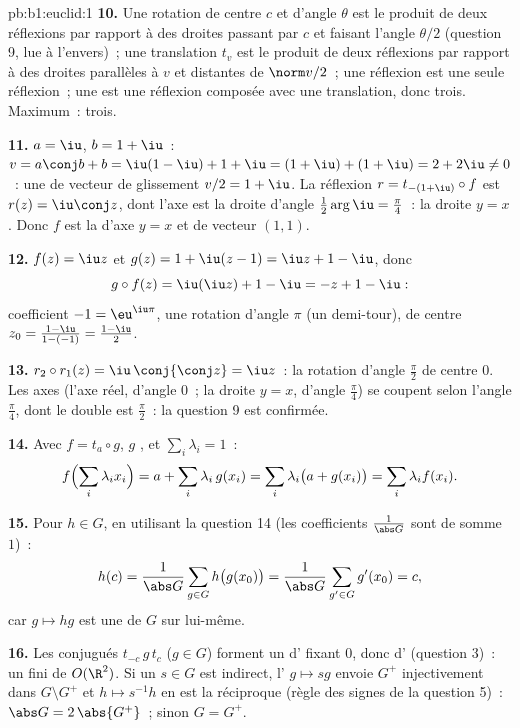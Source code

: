 \begin{solution}{pb:b1:euclid:1}
\textbf{10.} Une rotation de centre $c$ et d'angle $\theta$ est le
produit de deux réflexions par rapport à des droites passant par $c$
et faisant l'angle $\theta/2$ (question 9, lue à l'envers)~; une
translation $t_v$ est le produit de deux réflexions par rapport à
des droites parallèles  à $v$ et distantes de $\norm
v/2$~; une réflexion est une seule réflexion~; une 
est une réflexion composée avec une translation, donc trois.
Maximum~: trois.

\textbf{11.} $a = \iu$, $b = 1 + \iu$~: $v = a\conj b + b =
\iu(1 - \iu) + 1 + \iu = (1 + \iu) + (1 + \iu) = 2 + 2\iu \neq
0$~: une  de vecteur de glissement $v/2 = 1 + \iu$.
La réflexion $r = t_{-(1+\iu)}\circ f$ est $r(z) = \iu\conj z$,
dont l'axe est la droite d'angle $\frac12\arg\iu = \frac\pi4$~:
la droite $y = x$. Donc $f$ est la  d'axe $y =
x$ et de vecteur $(1, 1)$.

\textbf{12.} $f(z) = \iu z$ et $g(z) = 1 + \iu(z - 1) = \iu z
+ 1 - \iu$, donc
\[
g\circ f(z) = \iu(\iu z) + 1 - \iu = -z + 1 - \iu :
\]
coefficient  $-1 = \eu^{\iu\pi}$, une rotation d'angle
$\pi$ (un demi-tour), de centre $z_0 = \frac{1 - \iu}{1 - (-1)}
= \frac{1 - \iu}{2}$.

\textbf{13.} $r_2\circ r_1(z) = \iu\,\conj{\conj z} = \iu z$~:
la rotation d'angle $\frac\pi2$ de centre $0$. Les axes (l'axe
réel, d'angle $0$~; la droite $y = x$, d'angle $\frac\pi4$) se
coupent selon l'angle $\frac\pi4$, dont le double est $\frac\pi2$~:
la question 9 est confirmée.

\textbf{14.} Avec $f = t_a\circ g$, $g$ , et $\sum_i
\lambda_i = 1$~:
\[
f\Bigl(\sum_i \lambda_i x_i\Bigr)
= a + \sum_i \lambda_i\,g(x_i)
= \sum_i \lambda_i\bigl(a + g(x_i)\bigr)
= \sum_i \lambda_i f(x_i) .
\]

\textbf{15.} Pour $h \in G$, en utilisant la question 14 (les
coefficients $\frac1{\abs G}$ sont de somme $1$)~:
\[
h(c) = \frac{1}{\abs G}\sum_{g \in G} h\bigl(g(x_0)\bigr)
= \frac{1}{\abs G}\sum_{g' \in G} g'(x_0) = c ,
\]
car $g \mapsto hg$ est une  de $G$ sur lui-même.

\textbf{16.} Les conjugués $t_{-c}\,g\,t_{c}$ ($g \in G$) forment
un  d' fixant $0$, donc d'
\emph{} (question 3)~: un  fini de $O(\R^2)$. Si
un $s \in G$ est indirect, l' $g \mapsto sg$ envoie $G^+$
injectivement dans $G\setminus G^+$ et $h \mapsto s^{-1}h$ en est la
réciproque (règle des signes de la question 5)~: $\abs G =
2\,\abs{G^+}$~; sinon $G = G^+$.


\end{solution}
